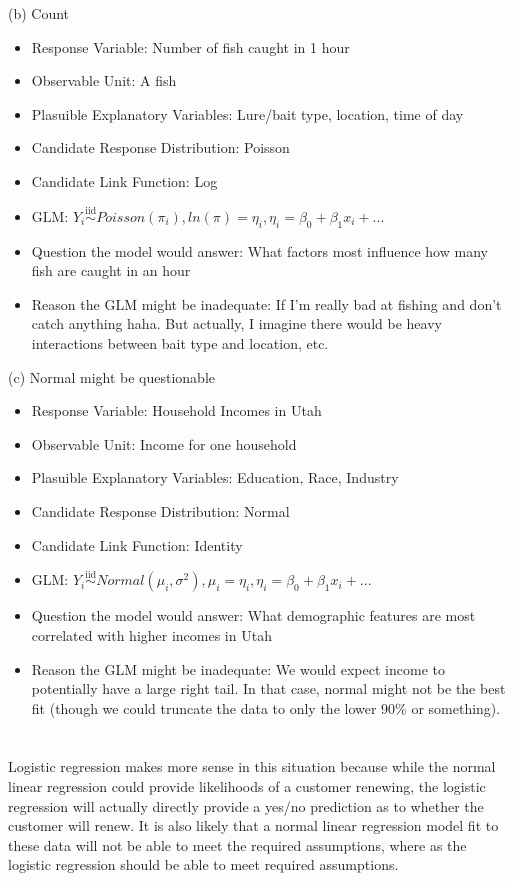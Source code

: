 \documentclass{article}
\newcommand{\iiddist}{\overset{\mathrm{iid}}{\sim}}
\begin{document}
(b) Count

\begin{itemize}
    \item Response Variable: Number of fish caught in 1 hour
    \item Observable Unit: A fish
    \item Plasuible Explanatory Variables: Lure/bait type, location, time of day
    \item Candidate Response Distribution: Poisson
    \item Candidate Link Function: Log
    \item GLM: $Y_i \iiddist Poisson(\pi_i), ln(\pi) = \eta_i, \eta_i = \beta_0 + \beta_1 x_i + ...$
    \item Question the model would answer: What factors most influence how many fish are caught in an hour
    \item Reason the GLM might be inadequate: If I'm really bad at fishing and don't catch anything haha. But actually, I imagine there would be heavy interactions between bait type and location, etc. 
\end{itemize}

(c) Normal might be questionable

\begin{itemize}
    \item Response Variable: Household Incomes in Utah
    \item Observable Unit: Income for one household
    \item Plasuible Explanatory Variables: Education, Race, Industry
    \item Candidate Response Distribution: Normal
    \item Candidate Link Function: Identity
    \item GLM: $Y_i \iiddist Normal(\mu_i, \sigma^2), \mu_i = \eta_i, \eta_i = \beta_0 + \beta_1 x_i + ...$
    \item Question the model would answer: What demographic features are most correlated with higher incomes in Utah
    \item Reason the GLM might be inadequate: We would expect income to potentially have a large right tail. In that case, normal might not be the best fit (though we could truncate the data to only the lower 90\% or something).
\end{itemize}


\section{}

Logistic regression makes more sense in this situation because while the normal linear regression could provide likelihoods of a customer renewing, the logistic regression will actually directly provide a yes/no prediction as to whether the customer will renew. It is also likely that a normal linear regression model fit to these data will not be able to meet the required assumptions, where as the logistic regression should be able to meet required assumptions. 
\end{document}

